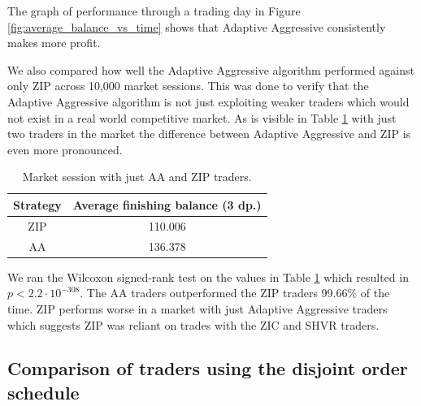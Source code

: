 \documentclass[preprint]{acm_proc_article-sp} %
\begin{document}
The graph of performance through a trading day in Figure
\ref{fig:average_balance_vs_time} shows that Adaptive Aggressive consistently
makes more profit.

We also compared how well the Adaptive Aggressive algorithm performed against
only ZIP across 10,000 market sessions. This was done to verify that the
Adaptive Aggressive algorithm is not just exploiting weaker traders which would
not exist in a real world competitive market. As is visible in Table
\ref{tbl:two_traders} with just two traders in the market the difference
between Adaptive Aggressive and ZIP is even more pronounced.
\begin{table}[H]
  \centering
  \begin{tabular}{ | c | c | }
    \hline
    Strategy & Average finishing balance (3 dp.) \\
    \hline
    ZIP & 110.006 \\
    AA & 136.378 \\
    \hline
  \end{tabular}
  \caption{Market session with just AA and ZIP traders.}
  \label{tbl:two_traders}
\end{table}

We ran the Wilcoxon signed-rank test on the values in Table
\ref{tbl:two_traders} which resulted in $p < 2.2 \cdot 10^{-308}$. The AA
traders outperformed the ZIP traders 99.66\% of the time. ZIP performs worse in
a market with just Adaptive Aggressive traders which suggests ZIP was reliant on trades with the
ZIC and SHVR traders.\\


\subsection{Comparison of traders using the disjoint order schedule}
\end{document}

